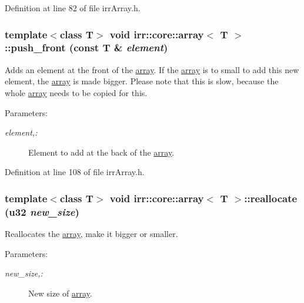 Definition at line 82 of file irrArray.h.\hypertarget{classirr_1_1core_1_1array_27ce37ef9e34e55d4f9987c62deda9d6}{
\subsubsection[{push\_\-front}]{\setlength{\rightskip}{0pt plus 5cm}template$<$class T$>$ void {\bf irr::core::array}$<$ T $>$::push\_\-front (const T \& {\em element})}}
\label{classirr_1_1core_1_1array_27ce37ef9e34e55d4f9987c62deda9d6}


Adds an element at the front of the \hyperlink{classirr_1_1core_1_1array}{array}. If the \hyperlink{classirr_1_1core_1_1array}{array} is to small to add this new element, the \hyperlink{classirr_1_1core_1_1array}{array} is made bigger. Please note that this is slow, because the whole \hyperlink{classirr_1_1core_1_1array}{array} needs to be copied for this. \begin{Desc}
\item[Parameters:]
\begin{description}
\item[{\em element,:}]Element to add at the back of the \hyperlink{classirr_1_1core_1_1array}{array}. \end{description}
\end{Desc}


Definition at line 108 of file irrArray.h.\hypertarget{classirr_1_1core_1_1array_1fa222a8692a1e2da94bc7e86b75cdae}{
\subsubsection[{reallocate}]{\setlength{\rightskip}{0pt plus 5cm}template$<$class T$>$ void {\bf irr::core::array}$<$ T $>$::reallocate ({\bf u32} {\em new\_\-size})}}
\label{classirr_1_1core_1_1array_1fa222a8692a1e2da94bc7e86b75cdae}


Reallocates the \hyperlink{classirr_1_1core_1_1array}{array}, make it bigger or smaller. \begin{Desc}
\item[Parameters:]
\begin{description}
\item[{\em new\_\-size,:}]New size of \hyperlink{classirr_1_1core_1_1array}{array}. \end{description}
\end{Desc}


